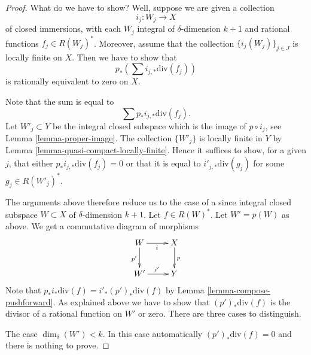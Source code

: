 \documentclass[10pt,a4paper]{amsart}
\theoremstyle{plain}
\theoremstyle{definition}
\theoremstyle{remark}
\numberwithin{equation}{subsection}
\begin{document}
\begin{proof}
What do we have to show? Well, suppose we are given a collection
$$
i_j : W_j \longrightarrow X
$$
of closed immersions, with each $W_j$ integral of $\delta$-dimension $k + 1$
and rational functions $f_j \in R(W_j)^*$.
Moreover, assume that
the collection $\{i_j(W_j)\}_{j \in J}$ is locally finite on $X$.
Then we have to show that
$$
p_*\left(\sum i_{j, *}\text{div}(f_j)\right)
$$
is rationally equivalent to zero on $X$.

\medskip\noindent
Note that the sum is equal to
$$
\sum p_*i_{j, *}\text{div}(f_j).
$$
Let $W'_j \subset Y$ be the integral closed subspace which is the
image of $p \circ i_j$, see Lemma \ref{lemma-proper-image}.
The collection $\{W'_j\}$ is locally finite
in $Y$ by Lemma \ref{lemma-quasi-compact-locally-finite}.
Hence it suffices to show, for a given $j$, that either
$p_*i_{j, *}\text{div}(f_j) = 0$ or that it
is equal to $i'_{j, *}\text{div}(g_j)$ for some $g_j \in R(W'_j)^*$.

\medskip\noindent
The arguments above therefore reduce us to the case of a since
integral closed subspace $W \subset X$ of $\delta$-dimension $k + 1$.
Let $f \in R(W)^*$. Let $W' = p(W)$ as above.
We get a commutative diagram of morphisms
$$
\xymatrix{
W \ar[r]_i \ar[d]_{p'} & X \ar[d]^p \\
W' \ar[r]^{i'} & Y
}
$$
Note that $p_*i_*\text{div}(f) = i'_*(p')_*\text{div}(f)$ by
Lemma \ref{lemma-compose-pushforward}. As explained above
we have to show that $(p')_*\text{div}(f)$
is the divisor of a rational function on $W'$ or zero.
There are three cases to distinguish.

\medskip\noindent
The case $\dim_\delta(W') < k$. In this case automatically
$(p')_*\text{div}(f) = 0$ and there is nothing to prove.


\end{proof}
\end{document}
